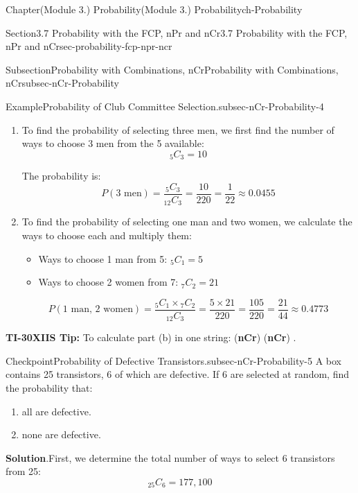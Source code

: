 \documentclass[oneside,10pt,]{book}
\newcommand{\blocktitlefont}{\relax}
\newcommand{\ptxlistdisc}{\raisebox{0.3ex}{\textbullet}}
\newcommand{\terminology}[1]{\textbf{#1}}
\newcommand{\kbd}[1]{\keys{{#1}}}
\begin{document}
\begin{chapterptx}{Chapter}{(Module 3.) Probability}{}{(Module 3.) Probability}{}{}{ch-Probability}
\begin{sectionptx}{Section}{3.7 Probability with the FCP, nPr and nCr}{}{3.7 Probability with the FCP, nPr and nCr}{}{}{sec-probability-fcp-npr-ncr}
\begin{subsectionptx}{Subsection}{Probability with Combinations, nCr}{}{Probability with Combinations, nCr}{}{}{subsec-nCr-Probability}
\begin{example}{Example}{Probability of Club Committee Selection.}{subsec-nCr-Probability-4}
\begin{enumerate}[label={\alph*}]
\item{}To find the probability of selecting three men, we first find the number of ways to choose 3 men from the 5 available:%
\begin{equation*}
{}_{5}C_{3} = 10
\end{equation*}
%
\par
The probability is:%
\begin{equation*}
P(\text{3 men}) = \frac{{}_{5}C_{3}}{{}_{12}C_{3}} = \frac{10}{220} = \frac{1}{22} \approx 0.0455
\end{equation*}
%
\item{}To find the probability of selecting one man and two women, we calculate the ways to choose each and multiply them:%
\begin{itemize}[label=\ptxlistdisc]
\item{}Ways to choose 1 man from 5: \({}_{5}C_{1} = 5\)%
\item{}Ways to choose 2 women from 7: \({}_{7}C_{2} = 21\)%
\end{itemize}
%
\begin{equation*}
P(\text{1 man, 2 women}) = \frac{{}_{5}C_{1} \times {}_{7}C_{2}}{{}_{12}C_{3}} = \frac{5 \times 21}{220} = \frac{105}{220} = \frac{21}{44} \approx 0.4773
\end{equation*}
%
\end{enumerate}
%
\par
\terminology{TI-30XIIS Tip:} To calculate part (b) in one string: \kbd{5} \kbd{PRB} (\terminology{nCr}) \kbd{1} \kbd{×} \kbd{7} \kbd{PRB} (\terminology{nCr}) \kbd{2} \kbd{÷} \kbd{220} \kbd{ENTER}.%
\end{example}
\begin{inlineexercise}{Checkpoint}{Probability of Defective Transistors.}{subsec-nCr-Probability-5}%
A box contains 25 transistors, 6 of which are defective. If 6 are selected at random, find the probability that:%
\begin{enumerate}[label={\alph*}]
\item{}all are defective.%
\item{}none are defective.%
\end{enumerate}
%
\par\smallskip%
\noindent\textbf{\blocktitlefont Solution}.\hypertarget{subsec-nCr-Probability-5-3}{}\quad{}First, we determine the total number of ways to select 6 transistors from 25:%
\begin{equation*}
{}_{25}C_{6} = 177,100
\end{equation*}
%
\par

\end{inlineexercise}
\end{subsectionptx}
\end{sectionptx}
\end{chapterptx}
\end{document}
